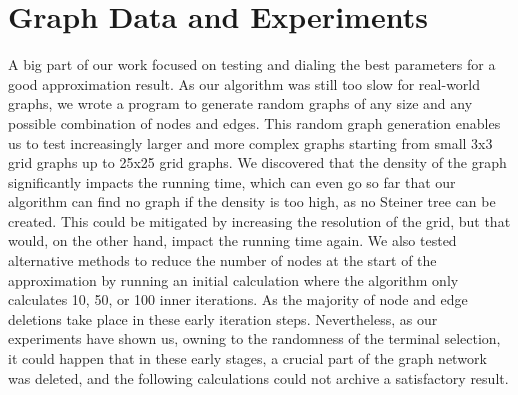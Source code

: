 \section{Graph Data and Experiments}
\label{sec:testing}

A big part of our work focused on testing and dialing the best parameters for a good approximation result. As our algorithm was still too slow for real-world graphs, we wrote a program to generate random graphs of any size and any possible combination of nodes and edges. This random graph generation enables us to test increasingly larger and more complex graphs starting from small 3x3 grid graphs up to 25x25 grid graphs. We discovered that the density of the graph significantly impacts the running time, which can even go so far that our algorithm can find no graph if the density is too high, as no Steiner tree can be created. This could be mitigated by increasing the resolution of the grid, but that would, on the other hand, impact the running time again.
We also tested alternative methods to reduce the number of nodes at the start of the approximation by running an initial calculation where the algorithm only calculates 10, 50, or 100 inner iterations. As the majority of node and edge deletions take place in these early iteration steps. Nevertheless, as our experiments have shown us, owning to the randomness of the terminal selection, it could happen that in these early stages, a crucial part of the graph network was deleted, and the following calculations could not archive a satisfactory result.
